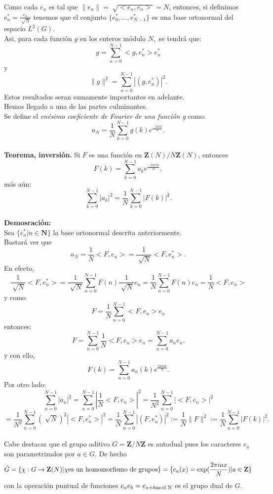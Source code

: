 \documentclass[a4paper,openright,10pt]{article}
\begin{document}
Como cada $e_{n}$ es tal que $\parallel e_{n}\parallel= \sqrt[]{<e_{n}, e_{n}>}=N$, entonces, si definimos $
e_{n} ^{*} =\frac{e_{n}}{\sqrt[]{N}}$ tenemos que el conjunto $\{ e_{0} ^{*},\dots, e_{N-1} ^{*}\}$ es una base ortonormal del espacio $L^{2} (G).$\\
Asi, para cada funci\'on $g$ en los enteros m\'odulo $N,$ se tendr\'a que: $$
g= \sum\limits_{n=0}^{N-1} <g, e_{n} ^{*}>e_{n} ^{*}
$$ y $$
\parallel g \parallel ^{2} = \sum\limits_{n=0}^{N-1} |(g, e_{n} ^{*})|^{2}.
$$Estos resultados seran sumamente importantes en adelante.\\

Hemos llegado a una de las partes culminantes.\\ 
Se define el \textit{en\'esimo coeficiente de Fourier de una funci\'on g} como:
$$
a_{N}= \frac{1}{N} \sum\limits_{k=0}^{N-1} g(k)e^{\frac{-2\pi ik}{N}}.
$$\\
\textbf{Teorema, inversi\'on.} Si $F$ es una funci\'on en $\mathbf{Z}(N)/N\mathbf{Z}(N)$, entonces \\$$
F(k)=\sum\limits_{k=0}^{N-1} a_{k}e^{\frac{-2\pi ikn}{N}}
,$$ m\'as a\'un: $$
\sum\limits_{k=0}^{N-1} |a_{k}|^{2} = 
\frac{1}{N} \sum\limits_{k=0}^{N-1} |F(k)|^{2}.
$$\\
\textbf{Demosraci\'on:}\\
Sea $\{e_{n}^{*} | n \in \mathbf{N} \}$ la base ortonormal descrita anteriormente.\\ 
Bastar\'a ver que $$
a_{N}=\frac{1}{N} <F, e_{n}>=\frac{1}{\sqrt[]{N}} <F, e_{n}^{*}>.$$
En efecto, $$
\frac{1}{\sqrt[]{N}}<F,e_{n}^{*}>
=\frac{1}{\sqrt[]{N}} \sum\limits_{n=0}^{N-1} F(n) \frac{1}{\sqrt[]{N}} e_{n}
=\frac{1}{N} \sum\limits_{n=0}^{N-1} F(n) e_{n}
=\frac{1}{N} <F, e_{n}>
$$
y como
$$
F=\frac{1}{N} \sum\limits_{n=0}^{N-1} <F, e_{n}>e_{n}
$$ entonces:
$$
F=\sum\limits_{n=0}^{N-1} \frac{1}{N} <F, e_{n}>e_{n}
=\sum\limits_{n=0}^{N-1} a_{n} e_{n}.
$$
y con ello,
$$
F(k)=\sum\limits_{n=0}^{N-1} a_{n}(k)e^ \frac{2\pi ink}{N}.$$
Por otro lado:
$$
\sum\limits_{n=0}^{N-1} |a_{n}|^{2} = 
\sum\limits_{n=0}^{N-1} |\frac{1}{N} <F, e_{n}>|^{2}
= \frac{1}{N^{2}} \sum\limits_{n=0}^{N-1} |<F, e_{n}>|^{2} $$
$$=
\frac{1}{N^{2}} \sum\limits_{n=0}^{N-1} (\sqrt[]{N}) ^{2} |<F, e_{n}^{*}>|^{2} =
\frac{1}{N} \sum\limits_{n=0}^{N-1}|(F, e_{n}^{*})|^{2}:= \frac{1}{N} \parallel F\parallel ^{2}:=
\frac{1}{N} \sum\limits_{n=0}^{N-1} |F(k)|^{2}.
$$\\

Cabe destacar que el grupo aditivo $G=\mathbf{Z}/N\mathbf{Z}$ es autodual pues los caracteres $e_{a}$ son parametrizados por $a\in G.$ De hecho $$
\hat{G}=\{\chi: G \rightarrow \mathbf{Z}(N) | \chi \textnormal{es un homomorfismo de grupos} \}=\{e_{a}(x)=\exp(\frac{2\pi iax}{N})|a\in \mathbf{Z} \}
$$ con la operaci\'on puntual de funciones $e_{a}e_{b}=e_{a+b\textnormal{mod N}}$ es el grupo dual de $G.$ \\
\end{document}
